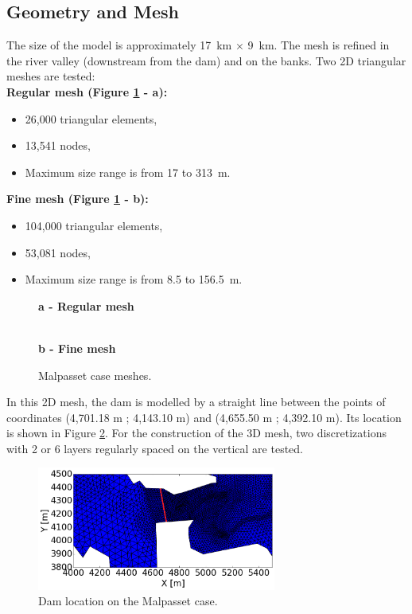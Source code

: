 \subsection{Geometry and Mesh}
The size of the model is approximately  17~km $\times$ 9~km. The mesh is refined in the river valley (downstream from the dam) and on the banks.
Two 2D triangular meshes are tested: \\
\textbf{Regular mesh (Figure \ref{fig:malpasset:Mesh} - a):}
\begin{itemize}
\itemsep0em
\item 26,000 triangular elements,
\item 13,541 nodes,
\item Maximum size range is from 17 to 313~m.
\end{itemize}
\textbf{Fine mesh (Figure \ref{fig:malpasset:Mesh} - b):}
\begin{itemize}
\itemsep0em
\item 104,000 triangular elements,
\item 53,081 nodes,
\item Maximum size range is from 8.5 to 156.5~m.
\end{itemize}
\begin{figure}[H]
  \centering
  \textbf{a - Regular mesh}\par\medskip
   \\
  \textbf{b - Fine mesh}\par\medskip
  \caption{Malpasset case meshes.}\label{fig:malpasset:Mesh}
\end{figure}
In this 2D mesh, the dam is modelled by a straight line between the points of
coordinates (4,701.18 m ; 4,143.10 m) and (4,655.50 m ; 4,392.10 m).
Its location is shown in Figure \ref{fig:malpasset:mesh_dam}.
For the construction of the 3D mesh, two discretizations with 2 or 6 layers regularly spaced on the
vertical are tested.
\begin{figure}[H] %
  \centering
  \includegraphics[width=0.7\textwidth]{img/Mesh_small_dam.png}
  \caption{Dam location on the Malpasset case.}\label{fig:malpasset:mesh_dam}
\end{figure}

